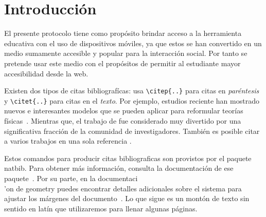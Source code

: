 
\chapter{Introducci\'on}

El presente protocolo tiene como prop\'osito brindar acceso a la herramienta educativa con el uso de dispositivos m\'oviles, ya que estos se han convertido en un medio sumamente accesible y popular para la interacci\'on social. Por tanto se pretende usar este medio con el prop\'ositos de permitir al estudiante mayor accesibilidad desde la web.

Existen dos tipos de citas bibliograf\'icas: usa \verb|\citep{..}| para
citas en \emph{par\'entesis} y \verb|\citet{..}| para citas
en el \emph{texto}. Por ejemplo, estudios reciente han mostrado nuevos e
interesantes modelos que se pueden aplicar para reformular teor\'ias
f\'isicas~\citep{NewCam97}. Mientras que, el trabajo de \citet{Rofl06} fue
considerado muy divertido por una significativa fracci\'on de la comunidad
de investigadores. Tambi\'en es posible citar a varios trabajos en una sola
referencia \citep{Lamport86,Knuth84}.

Estos comandos para producir citas bibliograficas son provistos por
el paquete \textsf{natbib}. Para obtener m\'as informaci\'on, consulta la
documentaci\'on de ese paquete~\citep{doc:natbib}. Por su parte, en
la documentaci\\'on de \textsf{geometry} puedes encontrar detalles
adicionales sobre el sistema para ajustar los m\'argenes del
documento~\citep{doc:geometry}. Lo que sigue
es un mont\'on de texto sin sentido en lat\'in que utilizaremos para llenar
algunas p\'aginas.
